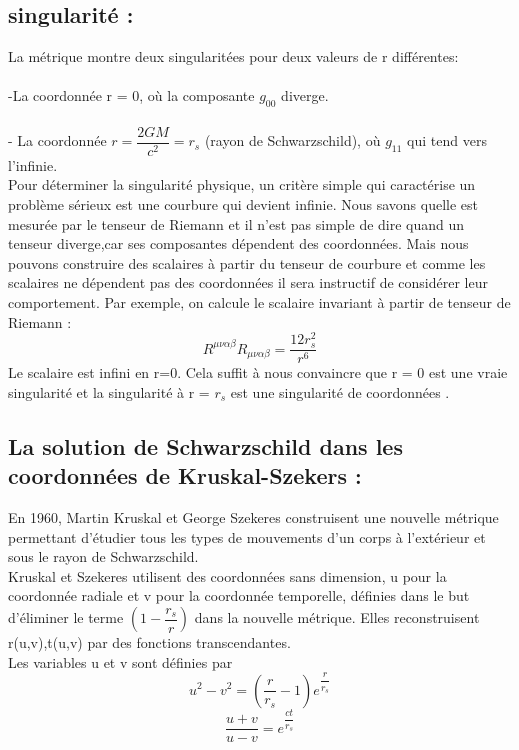 \subsection*{ singularité : }
La métrique montre deux singularitées pour deux valeurs de r différentes:\\
\\
-La coordonnée r = 0, où la composante $g_{00}$ diverge.\\
\\
- La coordonnée $ r = \dfrac{2GM}{c^{2}} = r_{s}$ (rayon de Schwarzschild), où $g_{11}$  qui tend vers l’infinie.\\
Pour déterminer la singularité physique, un critère simple qui caractérise un problème sérieux est une courbure qui devient infinie. Nous savons quelle est mesurée par le tenseur de Riemann et il n’est pas simple de dire quand un tenseur diverge,car ses composantes dépendent des coordonnées. Mais nous pouvons construire des scalaires à partir du tenseur de courbure et comme les scalaires ne dépendent pas des coordonnées il sera instructif de considérer leur comportement. Par exemple, on calcule le scalaire invariant à partir de tenseur de Riemann :
\begin{equation}
R^{\mu\nu\alpha\beta}R_{\mu\nu\alpha\beta}=\dfrac{12r_{s}^{2}}{r^{6}}
\end{equation}
Le scalaire est infini en r=0. Cela suffit à nous convaincre que r = 0 est une vraie singularité
et la singularité à r = $r_{s}$ est une singularité de coordonnées . 
\subsection*{ La solution de Schwarzschild dans les coordonnées de Kruskal-Szekers : }
En 1960, Martin Kruskal et George Szekeres construisent une nouvelle métrique permettant d'étudier tous les types de mouvements d'un corps à l'extérieur et sous le rayon de Schwarzschild.\\
Kruskal et Szekeres utilisent des coordonnées sans dimension,  u pour la coordonnée radiale et  v pour la coordonnée temporelle, définies dans le but d'éliminer le terme $(1-\dfrac{r_{s}}{r})$ dans la nouvelle métrique. Elles reconstruisent  r(u,v),t(u,v) par des fonctions transcendantes.\\
Les variables  u et v sont définies par \cite{9}
\begin{equation}
u^{2}-v^{2}=(\dfrac{r}{r_{s}}-1)e^{\dfrac{r}{r_{s}}}
\end{equation}
\begin{equation}
\dfrac{u+v}{u-v}=e^{\dfrac{ct}{r_{s}}}
\end{equation}

